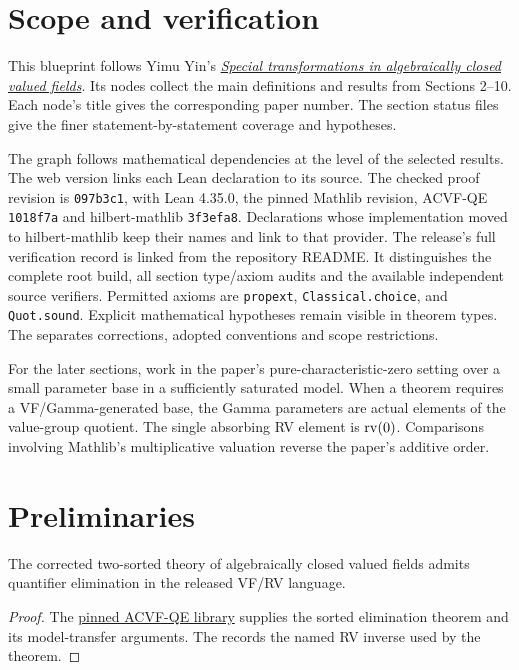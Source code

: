 \section*{Scope and verification}

This blueprint follows Yimu Yin's
\href{https://arxiv.org/abs/1006.2467v1}{\emph{Special transformations in
algebraically closed valued fields}}. Its nodes collect the main
definitions and results from Sections 2--10. Each node's title gives the
corresponding paper number. The section status files
give the finer statement-by-statement coverage and hypotheses.

The graph follows mathematical dependencies at the level of the selected
results. The web version links each Lean declaration to its source.
The checked proof revision is \texttt{097b3c1}, with Lean 4.35.0,
the pinned Mathlib revision, ACVF-QE \texttt{1018f7a} and hilbert-mathlib
\texttt{3f3efa8}. Declarations whose implementation moved to
hilbert-mathlib keep their names and link to that provider. The release's full
verification record is linked from the repository README. It distinguishes
the complete root build, all section type/axiom audits and the available
independent source verifiers. Permitted axioms are \texttt{propext},
\texttt{Classical.choice}, and \texttt{Quot.sound}. Explicit mathematical
hypotheses remain visible in theorem types. The
separates corrections, adopted conventions and scope restrictions.

For the later sections, work in the paper's pure-characteristic-zero
setting over a small parameter base in a sufficiently saturated model.
When a theorem requires a VF/Gamma-generated base, the Gamma parameters
are actual elements of the value-group quotient. The single absorbing RV
element is \(\operatorname{rv}(0)\). Comparisons involving Mathlib's multiplicative
valuation reverse the paper's additive order.

\setcounter{section}{1}
\section{Preliminaries}

\begin{theorem}
\label{thm:qe}
\leanok
The corrected two-sorted theory of algebraically closed valued fields
admits quantifier elimination in the released VF/RV language.
\end{theorem}
\begin{proof}
\leanok
The \href{https://github.com/daviddhilbert/ACVF-QE/tree/1018f7a36f0c2435e9146915ef7a0f60ba19dbd4}{pinned ACVF-QE library}
supplies the sorted elimination theorem and its model-transfer
arguments. The 
records the named RV inverse used by the theorem.
\end{proof}


